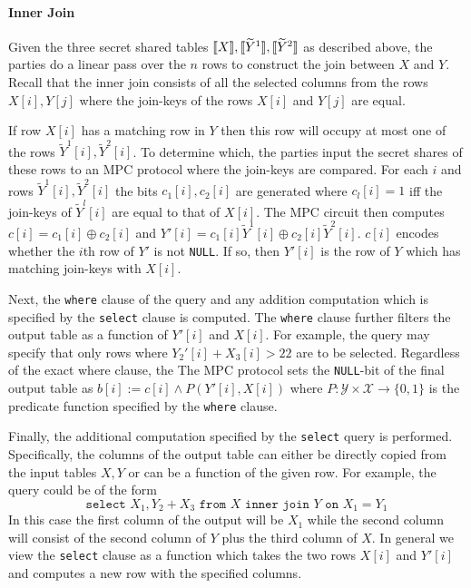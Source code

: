\paragraph{Inner Join}

Given the three secret shared tables $\llbracket X\rrbracket,\llbracket \widetilde{Y}^1\rrbracket,\llbracket \widetilde{Y}^2\rrbracket$ as described above, the parties do a linear pass over the $n$ rows to construct the join between $X$ and $Y$. Recall that the inner join consists of all the selected columns from the rows $X[i],Y[j]$ where  the join-keys of the rows $X[i]$ and $Y[j]$ are equal. %

If row $X[i]$ has a matching row in $Y$ then this row will occupy at most one of the rows ${\widetilde{Y}^1}[i],{\widetilde{Y}^2}[i]$. To determine which, the parties input the secret shares of these rows to an MPC protocol where the join-keys are compared. For each $i$ and rows ${\widetilde{Y}^1}[i],{\widetilde{Y}^2}[i]$ the bits $c_1[i],c_2[i]$ are generated where $c_l[i]=1$ iff the join-keys of ${\widetilde{Y}^l}[i]$ are equal to that of $X[i]$. The MPC circuit then computes $c[i]=c_1[i]\oplus c_2[i]$ and $Y'[i]=c_1[i]{\widetilde{Y}^1}[i]\oplus c_2[i]{\widetilde{Y}^2}[i]$. $c[i]$ encodes whether the $i$th row of $Y'$ is not \texttt{NULL}. If so, then $Y'[i]$ is the row of $Y$ which has matching join-keys with $X[i]$.

Next, the \texttt{where} clause of the query and any addition computation which is specified by the \texttt{select} clause is computed. The \texttt{where} clause further filters the output table as a function of $Y'[i]$ and $X[i]$. 
\iffullversion
For example, the query may specify that only rows where $Y_2'[i] + X_3[i] > 22$  are to be selected. Regardless of the exact where clause, the 
\else 
The
\fi
MPC protocol sets the \texttt{NULL}-bit of the final output table as $b[i] := c[i] \wedge P(Y'[i], X[i])$ where $P: \mathcal{Y}\times \mathcal{X} \rightarrow \{0,1\}$ is the predicate function specified by the \texttt{where} clause.

Finally, the additional computation specified by the \texttt{select} query is performed. Specifically, the columns of the output table can either be directly copied from the input tables $X,Y$ or can be a function of the given row. 
\iffullversion
For example, the query could be of the form 
$$
\texttt{select } X_1, Y_2 + X_3 \texttt{ from } X \texttt{ inner join } Y \texttt{ on } X_1 = Y_1
$$
In this case the first column of the output will be $X_1$ while the second column will consist of the second column of $Y$ plus the third column of $X$. 
\fi
In general we view the \texttt{select} clause as a function which takes the two rows $X[i]$ and $Y'[i]$ and computes a new row with the specified columns. 

